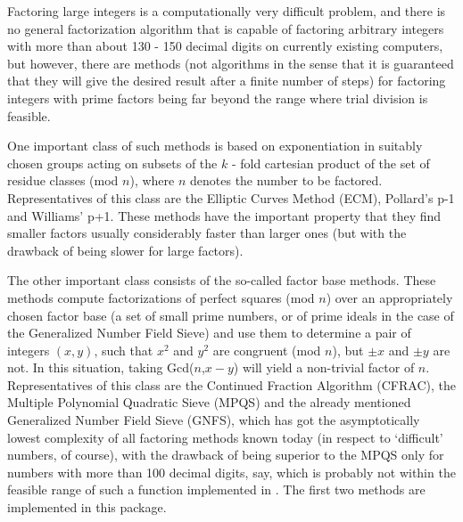 

Factoring large integers is a computationally very difficult problem,
and there is no general factorization algorithm that is capable of
factoring arbitrary integers with more than about 130 - 150 decimal
digits on currently existing computers, but however, there are
methods (not algorithms in the sense that it is guaranteed that
they will give the desired result after a finite number of steps) for 
factoring integers with prime factors being far beyond the range where
trial division is feasible.

One important class of such methods is based on exponentiation in
suitably chosen groups acting on subsets of the $k$ - fold cartesian
product of the set of residue classes (mod $n$), where $n$ denotes the
number to be factored.
Representatives of this class are the Elliptic Curves Method (ECM),
Pollard's p-1 and Williams' p+1.
These methods have the important property that they find smaller
factors usually considerably faster than larger ones
(but with the drawback of being slower for large factors).

The other important class consists of the so-called factor base methods.
These methods compute factorizations of perfect squares (mod $n$) over
an appropriately chosen factor base (a set of small prime numbers, or
of prime ideals in the case of the 
Generalized Number Field Sieve)
and use them to determine a pair of integers $(x,y)$, such that
$x^2$ and $y^2$ are congruent (mod $n$), but $\pm x$ and $\pm y$ are not.
In this situation, taking Gcd($n$,$x-y$) will yield a non-trivial
factor of $n$.
Representatives of this class are the Continued Fraction Algorithm 
(CFRAC), the Multiple Polynomial Quadratic Sieve (MPQS) and the
already mentioned Generalized Number Field Sieve (GNFS), which has got
the asymptotically lowest complexity of all factoring methods known today
(in respect to \lq difficult' numbers, of course), with the drawback
of being superior to the MPQS only for numbers with more than 100
decimal digits, say, which is probably not within the feasible range
of such a function implemented in {\GAP}.
The first two methods are implemented in this package.


